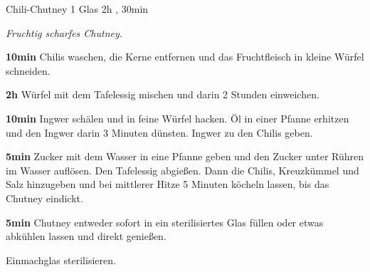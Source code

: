 \begin{recipe}{Chili-Chutney} {1 Glas} {2h , 30min }

  \freeform{}\textit{Fruchtig scharfes Chutney.}


  \textbf{10min}
  Chilis waschen, die Kerne entfernen und das Fruchtfleisch in kleine Würfel schneiden.


  \textbf{2h}
  Würfel mit dem Tafelessig mischen und darin 2 Stunden einweichen.


  \textbf{10min}
  Ingwer schälen und in feine Würfel hacken.
  Öl in einer Pfanne erhitzen und den Ingwer darin 3 Minuten dünsten.
  Ingwer zu den Chilis geben.


  \textbf{5min}
  Zucker mit dem Wasser in eine Pfanne geben und den Zucker unter Rühren im Wasser auflösen.
  Den Tafelessig abgießen.
  Dann die Chilis, Kreuzkümmel und Salz hinzugeben und bei mittlerer Hitze 5 Minuten köcheln lassen, bis das Chutney eindickt.

  \newstep{}\textbf{5min}
  Chutney entweder sofort in ein sterilisiertes Glas füllen oder etwas abkühlen lassen und direkt genießen.

  \freeform{}\hrulefill{}

  \freeform{}
  Einmachglas sterilisieren.

\end{recipe}
